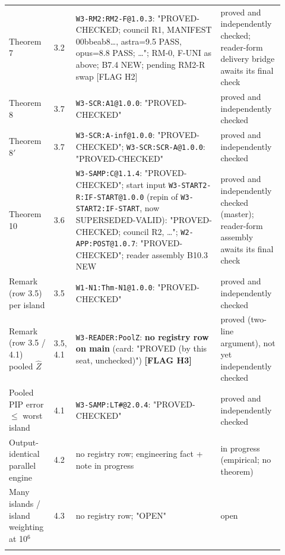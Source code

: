 \begin{longtable}{@{}p{0.15\linewidth}p{0.05\linewidth}p{0.5\linewidth}p{0.22\linewidth}@{}}
Theorem 7 & 3.2 & \texttt{W3-RM2:RM2-F@1.0.3}: "PROVED-CHECKED; council R1, MANIFEST 00bbeab8\ldots{}, astra=9.5 PASS, opus=8.8 PASS; \ldots{}"; RM-0, F-UNI as above; B7.4 NEW; pending RM2-R swap [FLAG H2] & proved and independently checked; reader-form delivery bridge awaits its final check \\ \addlinespace
Theorem 8 & 3.7 & \texttt{W3-SCR:A1@1.0.0}: "PROVED-CHECKED" & proved and independently checked \\ \addlinespace
Theorem 8$'$ & 3.7 & \texttt{W3-SCR:A-inf@1.0.0}: "PROVED-CHECKED"; \texttt{W3-SCR:SCR-A@1.0.0}: "PROVED-CHECKED" & proved and independently checked \\ \addlinespace
Theorem 10 & 3.6 & \texttt{W3-SAMP:C@1.1.4}: "PROVED-CHECKED"; start input \texttt{W3-START2-R:IF-START@1.0.0} (repin of \texttt{W3-START2:IF-START}, now SUPERSEDED-VALID): "PROVED-CHECKED; council R2, \ldots{}"; \texttt{W2-APP:POST@1.0.7}: "PROVED-CHECKED"; reader assembly B10.3 NEW & proved and independently checked (master); reader-form assembly awaits its final check \\ \addlinespace
Remark (row 3.5) per island & 3.5 & \texttt{W1-N1:Thm-N1@1.0.0}: "PROVED-CHECKED" & proved and independently checked \\ \addlinespace
Remark (row 3.5 / 4.1) pooled $\hat Z$ & 3.5, 4.1 & \texttt{W3-READER:PoolZ}: \textbf{no registry row on main} (card: "PROVED (by this seat, unchecked)") \textbf{[FLAG H3]} & proved (two-line argument), not yet independently checked \\ \addlinespace
Pooled PIP error $\le$ worst island & 4.1 & \texttt{W3-SAMP:LT\#@2.0.4}: "PROVED-CHECKED" & proved and independently checked \\ \addlinespace
Output-identical parallel engine & 4.2 & no registry row; engineering fact + note in progress & in progress (empirical; no theorem) \\ \addlinespace
Many islands / island weighting at 10$^6$ & 4.3 & no registry row; "OPEN" & open \\ \addlinespace
\bottomrule
\end{longtable}
\endgroup
